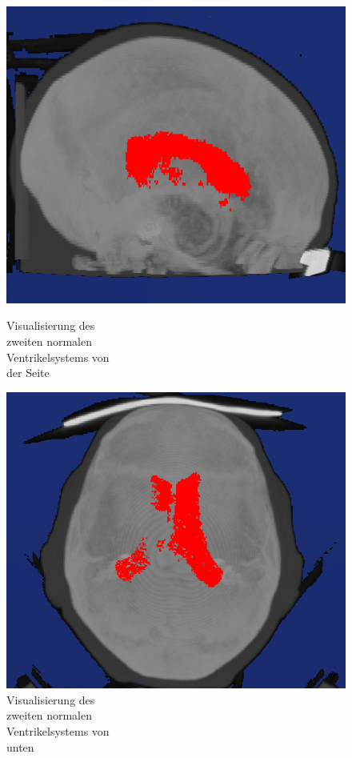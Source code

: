 \begin{figure}[H]
\begin{minipage}[t]{.5\textwidth}
  \centering
  \includegraphics[width=.9\linewidth, height=.9\linewidth]{Logos/Normal2/Seite2.PNG}
  \caption{Visualisierung des \\ zweiten normalen \\ Ventrikelsystems von \\ der Seite}
  \label{fig:norm2_s}
\end{minipage}%
\begin{minipage}[t]{.5\textwidth}
  \centering
  \includegraphics[width=.9\linewidth, height=.9\linewidth]{Logos/Normal2/Unten3.PNG}
  \caption{Visualisierung des \\ zweiten normalen \\ Ventrikelsystems von \\ unten}
  \label{fig:norm2_u}
\end{minipage}
\end{figure}

